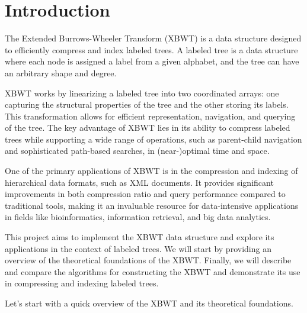 \chapter{Introduction}

The Extended Burrows-Wheeler Transform (XBWT) is a data structure designed to efficiently compress and index labeled trees. A labeled tree is a data structure where each node is assigned a label from a given alphabet, and the tree can have an arbitrary shape and degree.

XBWT works by linearizing a labeled tree into two coordinated arrays: one capturing the structural properties of the tree and the other storing its labels. This transformation allows for efficient representation, navigation, and querying of the tree. The key advantage of XBWT lies in its ability to compress labeled trees while supporting a wide range of operations, such as parent-child navigation and sophisticated path-based searches, in (near-)optimal time and space.

One of the primary applications of XBWT is in the compression and indexing of hierarchical data formats, such as XML documents. It provides significant improvements in both compression ratio and query performance compared to traditional tools, making it an invaluable resource for data-intensive applications in fields like bioinformatics, information retrieval, and big data analytics.

This project aims to implement the XBWT data structure and explore its applications in the context of labeled trees. We will start by providing an overview of the theoretical foundations of the XBWT. Finally, we will describe and compare the algorithms for constructing the XBWT and demonstrate its use in compressing and indexing labeled trees.

Let's start with a quick overview of the XBWT and its theoretical foundations.


